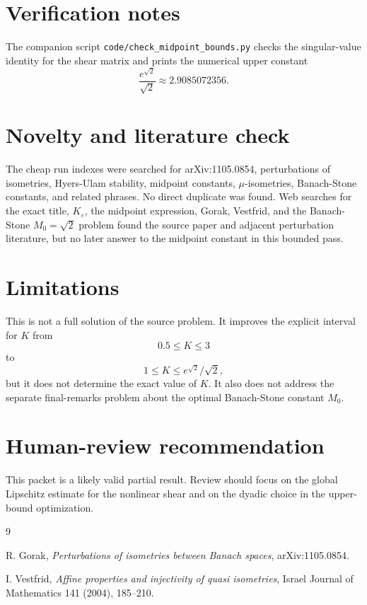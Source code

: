 \documentclass[11pt]{article}
\newcommand{\eps}{\varepsilon}
\begin{document}
\section*{Verification notes}

The companion script \texttt{code/check\_midpoint\_bounds.py} checks the
singular-value identity for the shear matrix and prints the numerical upper
constant
\[
\frac{e^{\sqrt2}}{\sqrt2}\approx 2.9085072356.
\]

\section*{Novelty and literature check}

The cheap run indexes were searched for arXiv:1105.0854, perturbations of
isometries, Hyers-Ulam stability, midpoint constants, \(\mu\)-isometries,
Banach-Stone constants, and related phrases.  No direct duplicate was found.
Web searches for the exact title, \(K_\eps\), the midpoint expression, Gorak,
Vestfrid, and the Banach-Stone \(M_0=\sqrt2\) problem found the source paper
and adjacent perturbation literature, but no later answer to the midpoint
constant in this bounded pass.

\section*{Limitations}

This is not a full solution of the source problem.  It improves the explicit
interval for \(K\) from
\[
0.5\le K\le3
\]
to
\[
1\le K\le e^{\sqrt2}/\sqrt2,
\]
but it does not determine the exact value of \(K\).  It also does not address
the separate final-remarks problem about the optimal Banach-Stone constant
\(M_0\).

\section*{Human-review recommendation}

This packet is a likely valid partial result.  Review should focus on the
global Lipschitz estimate for the nonlinear shear and on the dyadic choice in
the upper-bound optimization.

\begin{thebibliography}{9}

R. Gorak,
\emph{Perturbations of isometries between Banach spaces},
arXiv:1105.0854.

I. Vestfrid,
\emph{Affine properties and injectivity of quasi isometries},
Israel Journal of Mathematics 141 (2004), 185--210.

\end{thebibliography}
\end{document}
